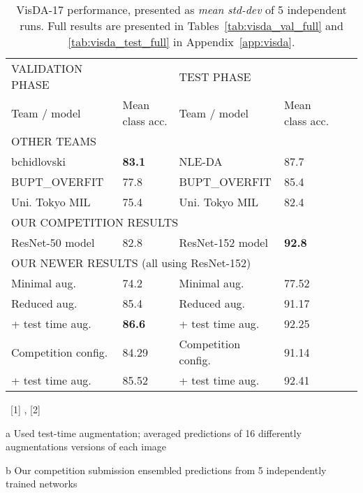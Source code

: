 \documentclass{article}
\begin{document}
\begin{table}[!t]
\begin{center}
\footnotesize
\begin{threeparttable}
\begin{tabular*}{\textwidth}{l @{\extracolsep{\fill}} lllll}
\hline
\hline
VALIDATION PHASE &  & TEST PHASE & \\
Team / model & Mean class acc.         & Team / model & Mean class acc. \\
\hline
\hline
\multicolumn{4}{l}{OTHER TEAMS} \\
\rule{0pt}{2.5ex}bchidlovski~\tnote{[1]} & \textbf{83.1} & NLE-DA~\tnote{[1]} & 87.7 \\
BUPT\_OVERFIT & 77.8 & BUPT\_OVERFIT & 85.4 \\
Uni. Tokyo MIL~\tnote{[2]} & 75.4 & Uni. Tokyo MIL~\tnote{[2]} & 82.4 \\
\hline
\multicolumn{4}{l}{OUR COMPETITION RESULTS} \\
\rule{0pt}{2.5ex}ResNet-50 model  & 82.8\tnote{a} & ResNet-152 model & \textbf{92.8}\tnote{ab} \\
\hline
\multicolumn{4}{l}{OUR NEWER RESULTS (all using ResNet-152)} \\
\rule{0pt}{2.5ex}Minimal aug.\tnote{*}  & 74.2              & Minimal aug.\tnote{*} & 77.52  \\

\rule{0pt}{2.5ex}Reduced aug.       & 85.4             & Reduced aug.      & 91.17  \\

                 + test time aug.     & \textbf{86.6} \tnote{a}   & + test time aug.    & 92.25 \tnote{a} \\

\rule{0pt}{2.5ex}Competition config.  & 84.29             & Competition config. & 91.14  \\

                 + test time aug.     & 85.52 \tnote{a}       & + test time aug.    & 92.41 \tnote{a} \\

\hline
\hline
\end{tabular*}

\begin{tablenotes}
   \item~[1] \cite{Csurka:DBN}, [2] \cite{Saito:ADR}
   \item[a] Used test-time augmentation; averaged predictions of 16 differently augmentations versions of each image
   \item[b] Our competition submission ensembled predictions from 5 independently trained networks
\end{tablenotes}


\caption{VisDA-17 performance, presented as \emph{mean}  \emph{std-dev} of 5 independent runs. Full results are presented in Tables~\ref{tab:visda_val_full} and \ref{tab:visda_test_full} in Appendix~\ref{app:visda}.}
\label{tab:visda_results}
\end{threeparttable}
\end{center}
\end{table}
\end{document}
